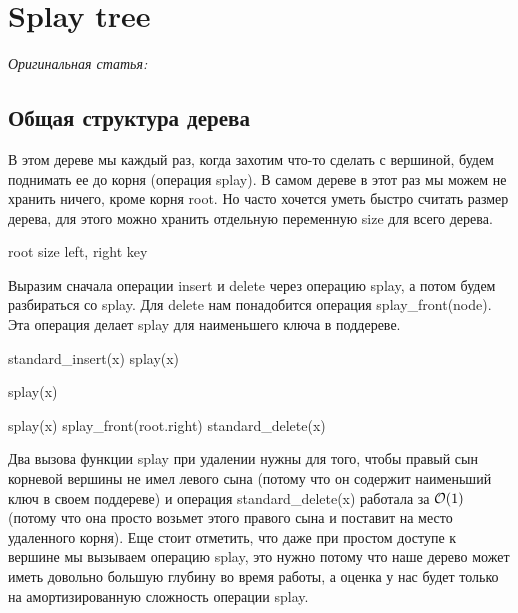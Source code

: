 \section{Splay tree} 
{\it Оригинальная статья:~\cite{tarjan1985splay}}

\subsection{Общая структура дерева}

В этом дереве мы каждый раз, когда захотим что-то сделать с вершиной, будем поднимать ее до корня (операция splay). В самом дереве в этот раз мы можем не хранить ничего, кроме корня root. Но часто хочется уметь быстро считать размер дерева, для этого можно хранить отдельную переменную size для всего дерева.

\begin{algorithmic}[0]
	\algrenewcommand{}
		\State root
		\State size 
	\EndProcedure
		\State left, right
		\State key
	\EndProcedure
\end{algorithmic}

Выразим сначала операции insert и delete через операцию splay, а потом будем разбираться со splay. Для delete нам понадобится операция splay\_front(node). Эта операция делает splay для наименьшего ключа в поддереве.

\begin{algorithmic}[1]
		\State standard\_insert(x)
		\State splay(x)
	\EndProcedure

		\State splay(x)
	\EndProcedure

		\State splay(x)
		\State splay\_front(root.right)
		\State standard\_delete(x)
	\EndProcedure
\end{algorithmic}

Два вызова функции splay при удалении нужны для того, чтобы правый сын корневой вершины не имел левого сына (потому что он содержит наименьший ключ в своем поддереве) и операция standard\_delete(x) работала за $\mathcal{O}(1)$ (потому что она просто возьмет этого правого сына и поставит на место удаленного корня). Еще стоит отметить, что даже при простом доступе к вершине мы вызываем операцию splay, это нужно потому что наше дерево может иметь довольно большую глубину во время работы, а оценка у нас будет только на амортизированную сложность операции splay.

